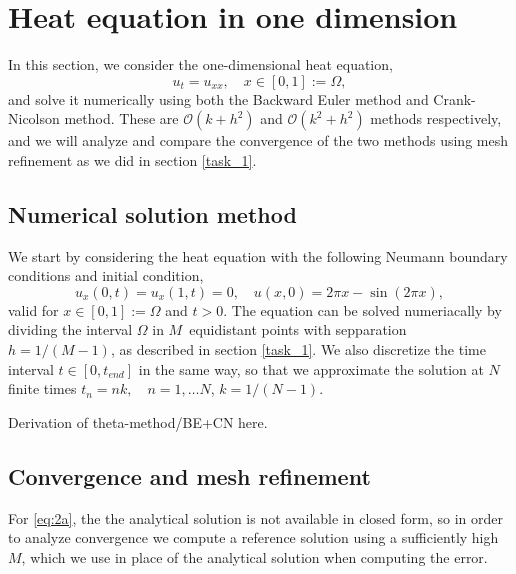 \section{Heat equation in one dimension}
In this section, we consider the one-dimensional heat equation, 
\begin{equation*}
    u_t = u_{xx},   \quad x \in [0,1] := \Omega, 
    \label{eq:heat-eq}
\end{equation*}
and solve it numerically using both the Backward Euler method and Crank-Nicolson method. 
These are $\mathcal{O}(k+h^2)$ and $\mathcal{O}(k^2+h^2)$ methods respectively, 
and we will analyze and compare the convergence of the two methods using mesh refinement as we did in section \ref{task_1}. 

\subsection{Numerical solution method}
We start by considering the heat equation with the following Neumann boundary conditions and initial condition, 
\begin{equation*}
    u_x(0,t) = u_x(1,t) = 0, \quad u(x,0) = 2\pi x - \sin(2\pi x),
    \label{eq:2a}
\end{equation*}
valid for $x \in [0,1] := \Omega$ and $t > 0$. 
The equation can be solved numeriacally by dividing the interval $\Omega$ in $M$ equidistant points with sepparation $h=1/(M-1)$, 
as described in section \ref{task_1}.
We also discretize the time interval $t \in [0,t_{end}]$ in the same way, 
so that we approximate the solution at $N$ finite times $t_n = nk, \quad n = 1, \ldots N$, 
\quad $k = 1/(N-1)$.

\begin{figure}[ht]
    \centering
    
\end{figure}

Derivation of theta-method/BE+CN here.

\begin{figure}[ht]
    \centering
    
\end{figure}

\subsection{Convergence and mesh refinement}
For \eqref{eq:2a}, the the analytical solution is not available in closed form, 
so in order to analyze convergence we compute a reference solution using a sufficiently high $M$, 
which we use in place of the analytical solution when computing the error. 

